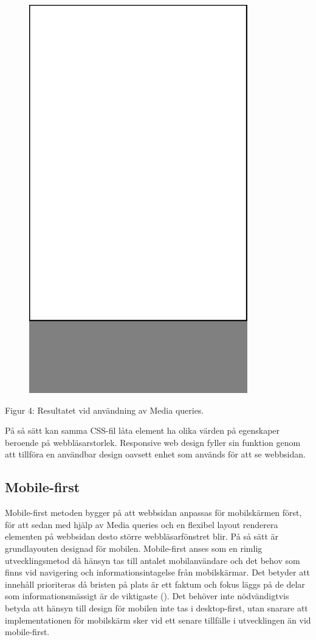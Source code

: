 \documentclass[11pt]{article}
\begin{document}
\vspace{1cm}
\begin{figure}[h]
\centerline{%
\includegraphics[scale=0.25]{pics/mobilesmall.png}
}
\end{figure}
\centerline{Figur 4: Resultatet vid användning av Media queries.}
\vspace{0.5cm}

På så sätt kan samma CSS-fil låta element ha olika värden på egenskaper beroende på webbläsarstorlek. Responsive web design fyller sin funktion genom att tillföra en användbar design oavsett enhet som används för att se webbsidan. 
\newpage

\subsection{Mobile-first}
Mobile-first metoden bygger på att webbsidan anpassas för mobilskärmen först, för att sedan med hjälp av Media queries och en flexibel layout renderera elementen på webbsidan desto större webbläsarfönstret blir.  På så sätt är grundlayouten designad för mobilen. Mobile-first anses som en rimlig utvecklingsmetod då hänsyn tas till antalet mobilanvändare och det behov som finns vid navigering och informationsintagelse från mobilskärmar.  Det betyder att innehåll prioriteras då bristen på plats är ett faktum och fokus läggs på de delar som informationsmässigt är de viktigaste (\cite{Mobilefirst}). Det behöver inte nödvändigtvis betyda att hänsyn till design för mobilen inte tas i desktop-first, utan snarare att implementationen för mobilskärm sker vid ett senare tillfälle i utvecklingen än vid mobile-first.
\end{document}

